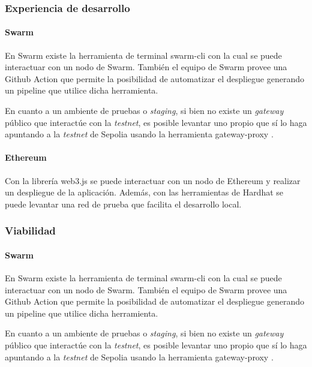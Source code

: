 \subsubsection{Experiencia de desarrollo} %

\paragraph{Swarm}
En Swarm existe la herramienta de terminal swarm-cli \cite{swarm-cli} con la cual se puede interactuar con un nodo de Swarm. También el equipo de Swarm provee una Github Action que permite la posibilidad de automatizar el despliegue generando un pipeline que utilice dicha herramienta.

En cuanto a un ambiente de pruebas o \textit{staging}, si bien no existe un \textit{gateway} público que interactúe con la \textit{testnet}, es posible levantar uno propio que sí lo haga apuntando a la \textit{testnet} de Sepolia usando la herramienta gateway-proxy \cite{gateway-proxy}.

\paragraph{Ethereum}
Con la librería web3.js se puede interactuar con un nodo de Ethereum y realizar un despliegue de la aplicación. Además, con las herramientas de Hardhat se puede levantar una red de prueba que facilita el desarrollo local.

\subsubsection{Viabilidad}

\paragraph{Swarm}
En Swarm existe la herramienta de terminal swarm-cli \cite{swarm-cli} con la cual se puede interactuar con un nodo de Swarm. También el equipo de Swarm provee una Github Action que permite la posibilidad de automatizar el despliegue generando un pipeline que utilice dicha herramienta.

En cuanto a un ambiente de pruebas o \textit{staging}, si bien no existe un \textit{gateway} público que interactúe con la \textit{testnet}, es posible levantar uno propio que sí lo haga apuntando a la \textit{testnet} de Sepolia usando la herramienta gateway-proxy \cite{gateway-proxy}.

